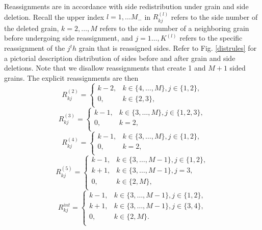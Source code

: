 Reassignments are in accordance with  side redistribution under grain and side deletion. Recall the upper index $l= 1, \dots M_-$  in $R_{kj}^{(l)}$ refers to the side number of the deleted grain, $k= 2,\dots, M$ refers to the side number of a neighboring grain before undergoing side reassignment, and $j= 1\dots, K^{(l)}$ refers to the specific reassignment of the $j^th$ grain that is reassigned sides. Refer to Fig. \ref{distrules} for a pictorial description distribution of sides before and after grain and side deletions. Note that we disallow reassignments that create 1 and $M+1$ sided  grains. 
The explicit reassignments are then\begin{equation}
R_{kj}^{(2)}= \begin{cases}k-2, & k \in \{4,\dots, M\},j\in \{1,2\},         \\
0, & k \in \{2,3\} ,  \ \\
\end{cases}
\end{equation}
\begin{equation}
R_{kj}^{(3)}= \begin{cases}k-1, & k \in \{3,\dots ,M\},j\in \{1,2,3\}, \\
0, & k =2,  \ \\
\end{cases}
\end{equation}
\begin{equation}
R_{kj}^{(4)}= \begin{cases}k-1, & k \in \{3,\dots ,M\},j\in \{1,2\}, \\
0, & k =2,  \ \\
\end{cases}
\end{equation}
\begin{equation}
R_{kj}^{(5)}= \begin{cases}k-1, & k\in \{3, \dots,M-1\}, j \in \{1,2\},    \\
k+1, & k\in \{3 ,\dots,M-1\},j=3,\\
0, & k\in \{2 ,M\},\\
\end{cases}
\end{equation}
\begin{equation}
R_{kj}^{int}= \begin{cases}k-1, & k\in \{3, \dots,M-1\}, j \in \{1,2\},    \\
k+1, & k\in \{3 ,\dots,M-1\},j\in\{3,4\},\\
0, & k\in \{2 ,M\}.\\
\end{cases}
\end{equation}

